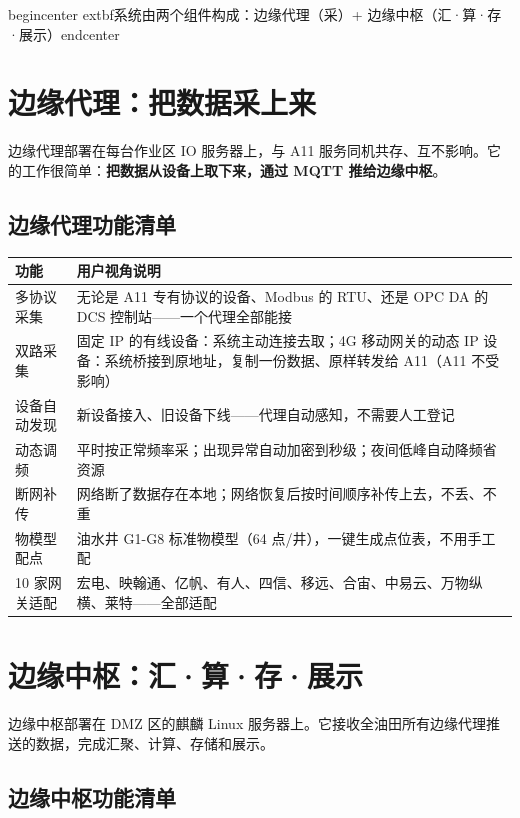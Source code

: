 \documentclass[11pt,a4paper]{ctexart}
\begin{document}
begin{center}	extbf{系统由两个组件构成：边缘代理（采）+ 边缘中枢（汇·算·存·展示）}end{center}



\section{边缘代理：把数据采上来}

边缘代理部署在每台作业区 IO 服务器上，与 A11 服务同机共存、互不影响。它的工作很简单：\textbf{把数据从设备上取下来，通过 MQTT 推给边缘中枢}。

\subsection{边缘代理功能清单}

\begin{table}[H]\centering
\begin{tabular}{p{3.2cm} p{8.0cm}}
\toprule
\textbf{功能} & \textbf{用户视角说明} \\
\midrule
多协议采集 & 无论是 A11 专有协议的设备、Modbus 的 RTU、还是 OPC DA 的 DCS 控制站——一个代理全部能接 \\
双路采集 & 固定 IP 的有线设备：系统主动连接去取；4G 移动网关的动态 IP 设备：系统桥接到原地址，复制一份数据、原样转发给 A11（A11 不受影响） \\
设备自动发现 & 新设备接入、旧设备下线——代理自动感知，不需要人工登记 \\
动态调频 & 平时按正常频率采；出现异常自动加密到秒级；夜间低峰自动降频省资源 \\
断网补传 & 网络断了数据存在本地；网络恢复后按时间顺序补传上去，不丢、不重 \\
物模型配点 & 油水井 G1-G8 标准物模型（64 点/井），一键生成点位表，不用手工配 \\
10 家网关适配 & 宏电、映翰通、亿帆、有人、四信、移远、合宙、中易云、万物纵横、莱特——全部适配 \\
\bottomrule
\end{tabular}
\end{table}

\section{边缘中枢：汇·算·存·展示}

边缘中枢部署在 DMZ 区的麒麟 Linux 服务器上。它接收全油田所有边缘代理推送的数据，完成汇聚、计算、存储和展示。

\subsection{边缘中枢功能清单}
\end{document}
